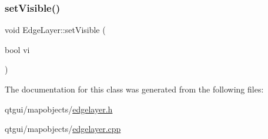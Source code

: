 \mbox{\label{class_edge_layer_ae39ae5f22c968da3cd3ee9c46f23445a}} 
\subsubsection{\texorpdfstring{setVisible()}{setVisible()}}
{\footnotesize\ttfamily void Edge\+Layer\+::set\+Visible (\begin{DoxyParamCaption}\item[{bool}]{vi }\end{DoxyParamCaption})\hspace{0.3cm}{\ttfamily [inline]}}



The documentation for this class was generated from the following files\+:\begin{DoxyCompactItemize}
\item 
qtgui/mapobjects/\mbox{\hyperlink{edgelayer_8h}{edgelayer.\+h}}\item 
qtgui/mapobjects/\mbox{\hyperlink{edgelayer_8cpp}{edgelayer.\+cpp}}\end{DoxyCompactItemize}
